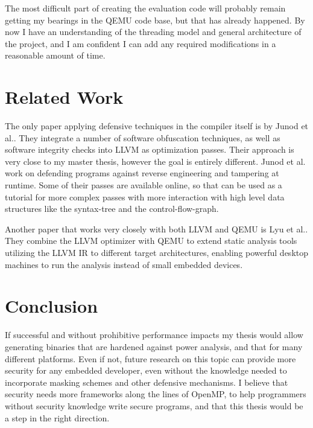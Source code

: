 \documentclass{article}
\newcommand{\qemu}{QEMU}
\newcommand{\llvm}{LLVM}
\begin{document}
The most difficult part of creating the evaluation code will probably remain getting my bearings in the \qemu{} code base, but that has already happened.
By now I have an understanding of the threading model and general architecture of the project, and I am confident I can add any required modifications in a reasonable amount of time.

\section{Related Work}
\label{sec:related-work}
The only paper applying defensive techniques in the compiler itself is by Junod et al.\cite{junod2015obfuscator}.
They integrate a number of software obfuscation techniques, as well as software integrity checks into \llvm{} as optimization passes.
Their approach is very close to my master thesis, however the goal is entirely different.
Junod et al. work on defending programs against reverse engineering and tampering at runtime.
Some of their passes are available online, so that can be used as a tutorial for more complex passes with more interaction with high level data structures like the syntax-tree and the control-flow-graph.

Another paper that works very closely with both \llvm{} and \qemu{} is Lyu et al.\cite{lyu2014dbill}.
They combine the \llvm{} optimizer with \qemu{} to extend static analysis tools utilizing the \llvm{} IR to different target architectures, enabling powerful desktop machines to run the analysis instead of small embedded devices.

\section{Conclusion}
\label{sec:conclusion-schedule}
If successful and without prohibitive performance impacts my thesis would allow generating binaries that are hardened against power analysis, and that for many different platforms.
Even if not, future research on this topic can provide more security for any embedded developer, even without the knowledge needed to incorporate masking schemes and other defensive mechanisms.
I believe that security needs more frameworks along the lines of OpenMP\cite{dagum1998openmp}, to help programmers without security knowledge write secure programs, and that this thesis would be a step in the right direction.



\end{document}
